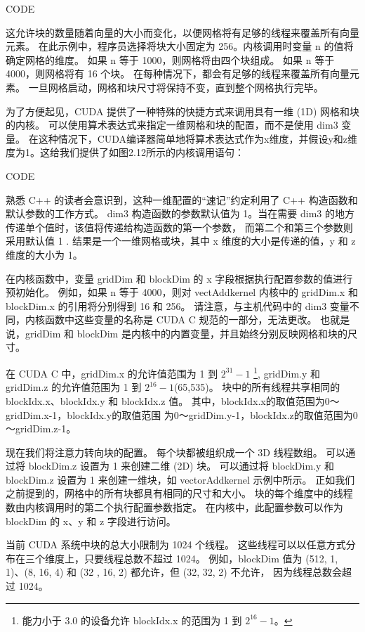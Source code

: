 {\color{red} CODE}

这允许块的数量随着向量的大小而变化，以便网格将有足够的线程来覆盖所有向量元素。 
在此示例中，程序员选择将块大小固定为 256。内核调用时变量 n 的值将确定网格的维度。 
如果 n 等于 1000，则网格将由四个块组成。 如果 n 等于 4000，则网格将有 16 个块。 
在每种情况下，都会有足够的线程来覆盖所有向量元素。 一旦网格启动，网格和块尺寸将保持不变，直到整个网格执行完毕。

为了方便起见，CUDA 提供了一种特殊的快捷方式来调用具有一维 (1D) 网格和块的内核。 
可以使用算术表达式来指定一维网格和块的配置，而不是使用 dim3 变量。 
在这种情况下，CUDA编译器简单地将算术表达式作为x维度，并假设y和z维度为1。这给我们提供了如图2.12所示的内核调用语句：

{\color{red} CODE}

熟悉 C++ 的读者会意识到，这种一维配置的“速记”约定利用了 C++ 构造函数和默认参数的工作方式。 
dim3 构造函数的参数默认值为 1。当在需要 dim3 的地方传递单个值时，该值将传递给构造函数的第一个参数，
而第二个和第三个参数则采用默认值 1 . 结果是一个一维网格或块，其中 x 维度的大小是传递的值，y 和 z 维度的大小为 1。

在内核函数中，变量 gridDim 和 blockDim 的 x 字段根据执行配置参数的值进行预初始化。 
例如，如果 n 等于 4000，则对 vectAddkernel 内核中的 gridDim.x 和 blockDim.x 的引用将分别得到 16 和 256。 
请注意，与主机代码中的 dim3 变量不同，内核函数中这些变量的名称是 CUDA C 规范的一部分，无法更改。 
也就是说，gridDim 和 blockDim 是内核中的内置变量，并且始终分别反映网格和块的尺寸。

在 CUDA C 中，gridDim.x 的允许值范围为 1 到 $2^{31} - 1$
\footnote{能力小于 3.0 的设备允许 blockIdx.x 的范围为 1 到 $2^{16} - 1$。},
gridDim.y 和 gridDim.z 的允许值范围为 1 到 $2^{16} - 1$(65,535)。 
块中的所有线程共享相同的 blockIdx.x、blockIdx.y 和 blockIdx.z 值。 
其中，blockIdx.x的取值范围为0～gridDim.x-1，blockIdx.y的取值范围
为0～gridDim.y-1，blockIdx.z的取值范围为0～gridDim.z-1。

现在我们将注意力转向块的配置。 每个块都被组织成一个 3D 线程数组。 可以通过将 blockDim.z 设置为 1 来创建二维 (2D) 块。
可以通过将 blockDim.y 和 blockDim.z 设置为 1 来创建一维块，如 vectorAddkernel 示例中所示。 
正如我们之前提到的，网格中的所有块都具有相同的尺寸和大小。 块的每个维度中的线程数由内核调用时的第二个执行配置参数指定。 
在内核中，此配置参数可以作为 blockDim 的 x、y 和 z 字段进行访问。

当前 CUDA 系统中块的总大小限制为 1024 个线程。 这些线程可以以任意方式分布在三个维度上，只要线程总数不超过 1024。
例如，blockDim 值为 (512, 1, 1)、(8, 16, 4) 和 (32 , 16, 2) 都允许，但 (32, 32, 2) 不允许，
因为线程总数会超过 1024。

